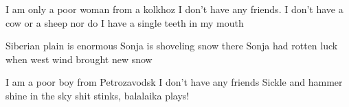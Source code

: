 \begin{paracol}{2}
\begin{guitar}
	I am only a poor woman from a kolkhoz
	I don't have any friends.
	I don't have a cow or a sheep
	nor do I have a single teeth in my mouth

	Siberian plain is enormous
	Sonja is shoveling snow there
	Sonja had rotten luck when
	west wind brought new snow

	I am a poor boy from Petrozavodsk
	I don't have any friends
	Sickle and hammer shine in the sky
	shit stinks, balalaika plays!
\end{guitar}
\end{paracol}

